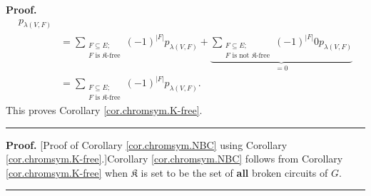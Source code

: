 \documentclass[numbers=enddot,12pt,final,onecolumn,notitlepage]{scrartcl}%
\theoremstyle{definition}
\newenvironment{proof}[1][Proof]{\noindent\textbf{#1.} }{\ \rule{0.5em}{0.5em}}
\newenvironment{verlong}{}{}
\newenvironment{vershort}{}{}
\let\sumnonlimits\sum
\renewcommand{\sum}{\sumnonlimits\limits}
\begin{document}
\begin{verlong}
\begin{proof}
\begin{align*}
{{}}p_{\lambda\left(  V,F\right)  }\\
&  =\sum_{\substack{F\subseteq E;\\F\text{ is }\mathfrak{K}\text{-free}%
}}\left(  -1\right)  ^{\left\vert F\right\vert }p_{\lambda\left(  V,F\right)
}+\underbrace{\sum_{\substack{F\subseteq E;\\F\text{ is not }\mathfrak{K}%
\text{-free}}}\left(  -1\right)  ^{\left\vert F\right\vert }0p_{\lambda\left(
V,F\right)  }}_{=0}\\
&  =\sum_{\substack{F\subseteq E;\\F\text{ is }\mathfrak{K}\text{-free}%
}}\left(  -1\right)  ^{\left\vert F\right\vert }p_{\lambda\left(  V,F\right)
}.
\end{align*}
This proves Corollary \ref{cor.chromsym.K-free}.
\end{proof}
\end{verlong}

\begin{vershort}
\begin{proof}
[Proof of Corollary \ref{cor.chromsym.NBC} using Corollary
\ref{cor.chromsym.K-free}.]Corollary \ref{cor.chromsym.NBC} follows from
Corollary \ref{cor.chromsym.K-free} when $\mathfrak{K}$ is set to be the set
of \textbf{all} broken circuits of $G$.
\end{proof}
\end{vershort}
\end{document}
